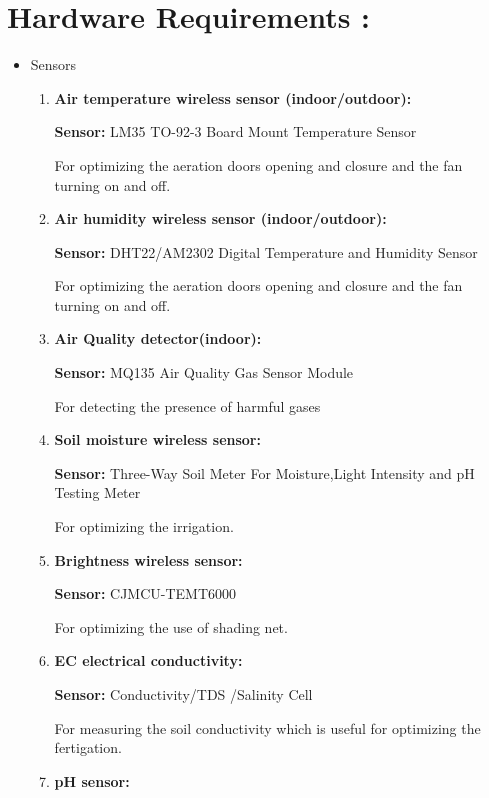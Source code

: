 \documentclass[12pt]{extarticle}
\begin{document}
\section{Hardware Requirements : }
\begin{itemize}
    \item Sensors \begin{enumerate}
        \item \textbf{Air temperature wireless sensor (indoor/outdoor):}
        
        \textbf{Sensor:} LM35 TO-92-3 Board Mount Temperature Sensor

For optimizing the aeration doors opening and closure and the fan turning on and off.
        \item \textbf{Air humidity wireless sensor (indoor/outdoor):}
        
        \textbf{Sensor:} DHT22/AM2302 Digital Temperature and Humidity Sensor

For optimizing the aeration doors opening and closure and the fan turning on and off.
        
        \item \textbf{Air Quality detector(indoor):}
        
        \textbf{Sensor:} MQ135 Air Quality Gas Sensor Module

For detecting the presence of harmful gases

        \item \textbf{Soil moisture wireless sensor:}
        
        \textbf{Sensor:} Three-Way Soil Meter For Moisture,Light Intensity and pH Testing Meter

For optimizing the irrigation.

        \item \textbf{Brightness wireless sensor:}
        
        \textbf{Sensor:} CJMCU-TEMT6000

For optimizing the use of shading net.

        \item \textbf{EC electrical conductivity:}
        
        \textbf{Sensor:} Conductivity/TDS /Salinity Cell

For measuring the soil conductivity which is useful for optimizing the fertigation.

        \item \textbf{pH sensor:}
        

\end{enumerate}
\end{itemize}
\end{document}
